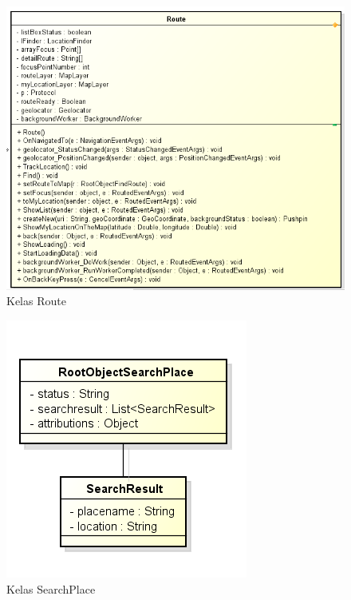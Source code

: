 \begin{figure}[h!]
	\centering
		\includegraphics[scale=0.6]{Gambar/useCase_dan_Class/perClass/route}
	\caption{Kelas Route}
	\label{fig:kelaslRoute}
\end{figure}

\begin{figure}[h!]
	\centering
		\includegraphics[scale=0.6]{Gambar/useCase_dan_Class/perClass/SearchPlace}
	\caption{Kelas SearchPlace}
	\label{fig:kelaslSearchPlace}
\end{figure}

